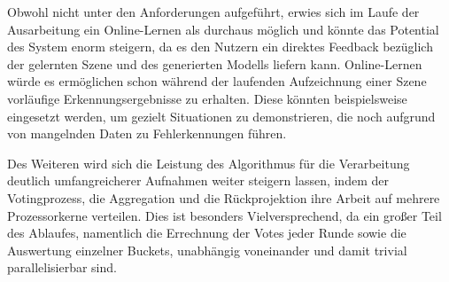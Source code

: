 Obwohl nicht unter den Anforderungen aufgeführt, erwies sich im Laufe der Ausarbeitung ein Online-Lernen als durchaus möglich und könnte das Potential des System enorm steigern, da es den Nutzern ein direktes Feedback bezüglich der gelernten Szene und des generierten Modells liefern kann.
Online-Lernen würde es ermöglichen schon während der laufenden Aufzeichnung einer Szene vorläufige Erkennungsergebnisse zu erhalten.
Diese könnten beispielsweise eingesetzt werden, um gezielt Situationen zu demonstrieren, die noch aufgrund von mangelnden Daten zu Fehlerkennungen führen.

Des Weiteren wird sich die Leistung des Algorithmus für die Verarbeitung deutlich umfangreicherer Aufnahmen weiter steigern lassen, indem der Votingprozess, die Aggregation und die Rückprojektion ihre Arbeit auf mehrere Prozessorkerne verteilen.
Dies ist besonders Vielversprechend, da ein großer Teil des Ablaufes, namentlich die Errechnung der Votes jeder Runde sowie die Auswertung einzelner Buckets, unabhängig voneinander und damit trivial parallelisierbar sind.
